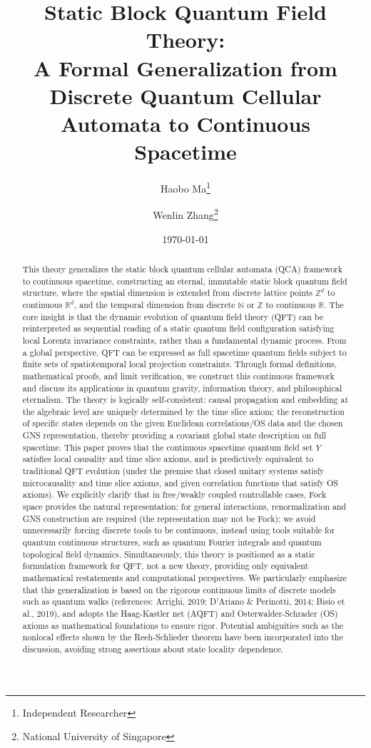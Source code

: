 \documentclass[11pt]{article}
\title{Static Block Quantum Field Theory:\\ A Formal Generalization from Discrete Quantum Cellular Automata to Continuous Spacetime}
\author{Haobo Ma\thanks{Independent Researcher} \and Wenlin Zhang\thanks{National University of Singapore}}
\date{\today}
\theoremstyle{definition}
\theoremstyle{remark}
\begin{document}
\maketitle

\begin{abstract}
This theory generalizes the static block quantum cellular automata (QCA) framework to continuous spacetime, constructing an eternal, immutable static block quantum field structure, where the spatial dimension is extended from discrete lattice points \( \mathbb{Z}^d \) to continuous \( \mathbb{R}^d \), and the temporal dimension from discrete \( \mathbb{N} \) or \( \mathbb{Z} \) to continuous \( \mathbb{R} \). The core insight is that the dynamic evolution of quantum field theory (QFT) can be reinterpreted as sequential reading of a static quantum field configuration satisfying local Lorentz invariance constraints, rather than a fundamental dynamic process. From a global perspective, QFT can be expressed as full spacetime quantum fields subject to finite sets of spatiotemporal local projection constraints. Through formal definitions, mathematical proofs, and limit verification, we construct this continuous framework and discuss its applications in quantum gravity, information theory, and philosophical eternalism. The theory is logically self-consistent: causal propagation and embedding at the algebraic level are uniquely determined by the time slice axiom; the reconstruction of specific states depends on the given Euclidean correlations/OS data and the chosen GNS representation, thereby providing a covariant global state description on full spacetime. This paper proves that the continuous spacetime quantum field set \( Y \) satisfies local causality and time slice axioms, and is predictively equivalent to traditional QFT evolution (under the premise that closed unitary systems satisfy microcausality and time slice axioms, and given correlation functions that satisfy OS axioms). We explicitly clarify that in free/weakly coupled controllable cases, Fock space provides the natural representation; for general interactions, renormalization and GNS construction are required (the representation may not be Fock); we avoid unnecessarily forcing discrete tools to be continuous, instead using tools suitable for quantum continuous structures, such as quantum Fourier integrals and quantum topological field dynamics. Simultaneously, this theory is positioned as a static formulation framework for QFT, not a new theory, providing only equivalent mathematical restatements and computational perspectives. We particularly emphasize that this generalization is based on the rigorous continuous limits of discrete models such as quantum walks (references: Arrighi, 2019; D'Ariano \& Perinotti, 2014; Bisio et al., 2019), and adopts the Haag-Kastler net (AQFT) and Osterwalder-Schrader (OS) axioms as mathematical foundations to ensure rigor. Potential ambiguities such as the nonlocal effects shown by the Reeh-Schlieder theorem have been incorporated into the discussion, avoiding strong assertions about state locality dependence.


\end{abstract}
\end{document}
